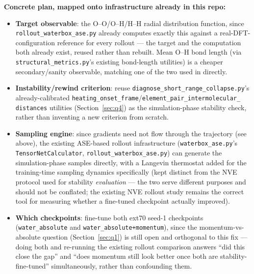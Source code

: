 \documentclass[11pt]{article}
\begin{document}
\textbf{Concrete plan, mapped onto infrastructure already in this repo:}
\begin{itemize}
  \item \textbf{Target observable}: the O--O/O--H/H--H radial distribution
  function, since \texttt{rollout\_waterbox\_ase.py} already computes
  exactly this against a real-DFT-configuration reference for every
  rollout --- the target and the computation both already exist, reused
  rather than rebuilt. Mean O--H bond length (via
  \texttt{structural\_metrics.py}'s existing bond-length utilities) is a
  cheaper secondary/sanity observable, matching one of the two used in
  \citet{raja2025stable} directly.
  \item \textbf{Instability/rewind criterion}: reuse
  \texttt{diagnose\_short\_range\_collapse.py}'s already-calibrated
  \texttt{heating\_onset\_frame}/\texttt{element\_pair\_intermolecular\_
  distances} utilities (Section~\ref{sec:q4}) as the simulation-phase
  stability check, rather than inventing a new criterion from scratch.
  \item \textbf{Sampling engine}: since gradients need not flow through the
  trajectory (see above), the existing ASE-based rollout infrastructure
  (\texttt{waterbox\_ase.py}'s \texttt{TensorNetCalculator},
  \texttt{rollout\_waterbox\_ase.py}) can generate the simulation-phase
  samples directly, with a Langevin thermostat added for the training-time
  sampling dynamics specifically (kept distinct from the NVE protocol used
  for stability \emph{evaluation} --- the two serve different purposes and
  should not be conflated; the existing NVE rollout study remains the
  correct tool for measuring whether a fine-tuned checkpoint actually
  improved).
  \item \textbf{Which checkpoints}: fine-tune both ext70 seed-1 checkpoints
  (\texttt{water\_absolute} and \texttt{water\_absolute+momentum}), since
  the momentum-vs-absolute question (Section~\ref{sec:q1}) is still open
  and orthogonal to this fix --- doing both and re-running the existing
  rollout comparison answers ``did this close the gap'' and ``does momentum
  still look better once both are stability-fine-tuned'' simultaneously,
  rather than confounding them.
\end{itemize}
\end{document}
